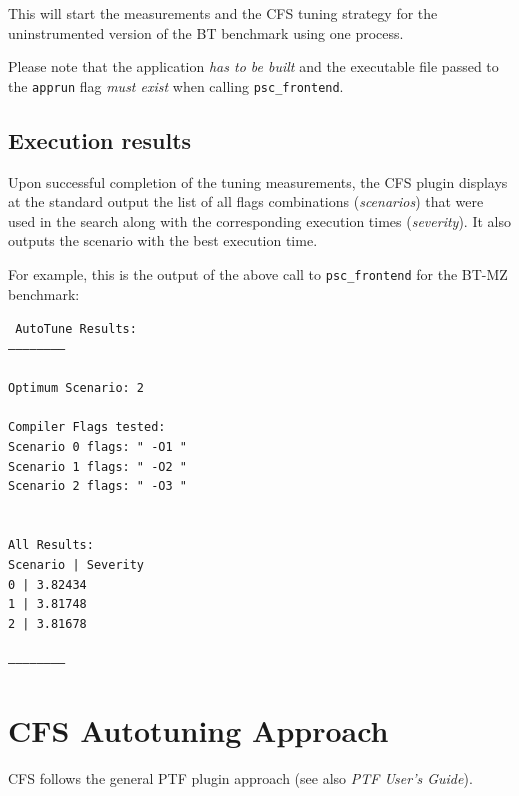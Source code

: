 \documentclass[11pt,a4paper, oneside]{book} %
\newenvironment{code}%
{
\addtolength{\leftskip}{0.5cm}}%
{

}
\begin{document}
\vspace*{0.5cm}
This will start the measurements and the CFS tuning strategy for the uninstrumented version of the BT benchmark using one process.

Please note that the application \textit{has to be built} and the executable file passed to the \texttt{apprun} flag \textit{must exist} when calling \texttt{psc\_frontend}.

\section{Execution results}

Upon successful completion of the tuning measurements, the CFS plugin displays at the standard output the list of all flags combinations (\textit{scenarios}) that were used in the search along with the corresponding execution times (\textit{severity}). It also outputs the scenario with the best execution time.

For example, this is the output of the above call to \texttt{psc\_frontend} for the BT-MZ benchmark:

\begin{code}
\texttt{
AutoTune Results:\\
-----------------------\\
\\
Optimum Scenario: 2\\
\\
Compiler Flags tested:\\
Scenario 0 flags: " -O1 "\\
Scenario 1 flags: " -O2 "\\
Scenario 2 flags: " -O3 "\\
\\
\\
All Results:\\
Scenario	|  Severity\\
0		|  3.82434\\
1		|  3.81748\\
2		|  3.81678\\
\\
------------------------}
\end{code}


\chapter{CFS Autotuning Approach}\label{sec:mappingPTF}
CFS follows the general PTF plugin approach (see also \textit{PTF User's Guide}).
\end{document}
